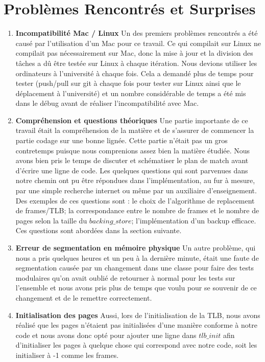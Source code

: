 \documentclass[12pt]{article}
\begin{document}
\section*{Problèmes Rencontrés et Surprises}
\begin{enumerate}
\item \textbf{Incompatibilité Mac / Linux}
\newline
Un des premiers problèmes rencontrés a été causé par l'utilisation d'un Mac pour ce travail. Ce qui compilait sur Linux ne compilait pas nécessairement sur Mac, donc la mise à jour et la division des tâches a dû être testée sur Linux à chaque itération. Nous devions utiliser les ordinateurs à l'université à chaque fois. Cela a demandé plus de temps pour tester (push/pull sur git à chaque fois pour tester sur Linux ainsi que le déplacement à l'université) et un nombre considérable de temps a été mis dans le débug avant de réaliser l'incompatibilité avec Mac. 

\item \textbf{Compréhension et questions théoriques}
\newline
Une partie importante de ce travail était la compréhension de la matière et de s'assurer de commencer la partie codage sur une bonne lignée. Cette partie n'était pas un gros contretemps puisque nous comprenions assez bien la matière étudiée. Nous avons bien pris le temps de discuter et schématiser le plan de match avant d'écrire une ligne de code. Les quelques questions qui sont parvenues dans notre chemin ont pu être répondues dans l'implémentation, au fur à mesure, par une simple recherche internet ou même par un auxiliaire d'enseignement. Des exemples de ces questions sont : le choix de l'algorithme de replacement de frames/TLB; la correspondance entre le nombre de frames et le nombre de pages selon la taille du $backing\_store$; l'implémentation d'un backup efficace. Ces questions sont abordées dans la section suivante.

\item \textbf{Erreur de segmentation en mémoire physique}
\newline
Un autre problème, qui nous a pris quelques heures et un peu à la dernière minute, était une faute de segmentation causée par un changement dans une classe pour faire des tests modulaires qu'on avait oublié de retourner à normal pour les tests sur l'ensemble et nous avons pris plus de temps que voulu pour se souvenir de ce changement et de le remettre correctement. 

\item \textbf{Initialisation des pages}
\newline
Aussi, lors de l'initialisation de la TLB, nous avons réalisé que les pages n'étaient pas initialisées d'une manière conforme à notre code et nous avons donc opté pour ajouter une ligne dans $tlb\_init$ afin d'initialiser les pages à quelque chose qui correspond avec notre code, soit les initialiser à -1 comme les frames.


\end{enumerate}
\end{document}
